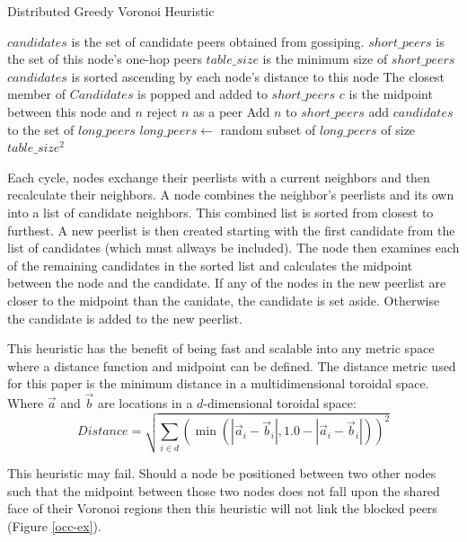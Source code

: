 \documentclass{IEEEtran}
\begin{document}
\begin{algorithm}
\caption{Distributed Greedy Voronoi Heuristic}
\label{DGVH}
\begin{algorithmic}[1]  %
	\STATE $candidates$ is the set of candidate peers obtained from gossiping.
    \STATE $short\_peers$ is the set of this node's one-hop peers
    \STATE $table\_size$ is the minimum size of $short\_peers$
    \STATE $candidates$ is sorted  ascending by each node's distance to this node
    \STATE The closest member of $Candidates$ is popped and added to $short\_peers$
    	\STATE $c$ is the midpoint between this node and $n$
        	\STATE reject $n$ as a peer
        \ELSE
        	\STATE Add $n$ to $short\_peers$
        \ENDIF
    \ENDFOR
    		\STATE add $candidates$ to the set of $long\_peers$
        		\STATE $long\_peers \leftarrow$ random subset of $long\_peers$ of size $table\_size^2$
        	\ENDIF
    	\ENDFOR
    \ENDWHILE
\end{algorithmic}
\end{algorithm}


Each cycle, nodes exchange their peerlists with a current neighbors and then recalculate their neighbors.  
A node combines the neighbor's peerlists and its own into a list of candidate neighbors.
This combined list is sorted from closest to furthest.
A new peerlist is then created starting with the first candidate from the list of candidates (which must allways be included).
The node then examines each of the remaining candidates in the sorted list and calculates the midpoint between the node and the candidate.
If any of the nodes in the new peerlist are closer to the midpoint than the canidate, the candidate is set aside.  Otherwise the candidate is added to the new peerlist.

This heuristic has the benefit of being fast and scalable into any metric space where a distance function and midpoint can be defined.
The distance metric used for this paper is the minimum distance in a multidimensional toroidal space.
Where $\vec{a}$ and $\vec{b}$ are locations in a $d$-dimensional toroidal space:
\[ Distance = \sqrt{\sum\limits_{i\in d} (\min(|\vec{a}_i-\vec{b}_i|, 1.0-|\vec{a}_i-\vec{b}_i|))^2}\]




This heuristic may fail.
Should a node be positioned between two other nodes such that the midpoint between those two nodes does not fall upon the shared face of their Voronoi regions then this heuristic will not link the blocked peers  (Figure \ref{occ-ex}). %
\end{document}
